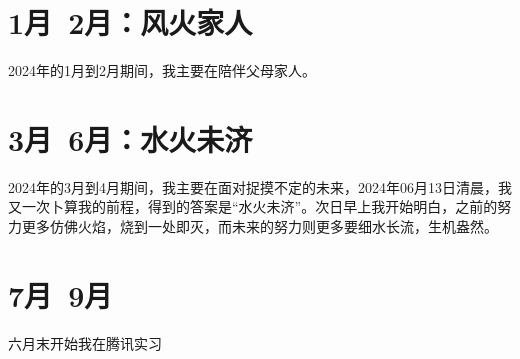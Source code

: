 \documentclass{si_template/cn_book}
\begin{document}
\frontmatter
\mainmatter

\chapter{1月~2月：风火家人}

2024年的1月到2月期间，我主要在陪伴父母家人。

\chapter{3月~6月：水火未济}

2024年的3月到4月期间，我主要在面对捉摸不定的未来，2024年06月13日清晨，我又一次卜算我的前程，得到的答案是“水火未济”。次日早上我开始明白，之前的努力更多仿佛火焰，烧到一处即灭，而未来的努力则更多要细水长流，生机盎然。









\chapter{7月~9月}

六月末开始我在腾讯实习

\backmatter
\end{document}
